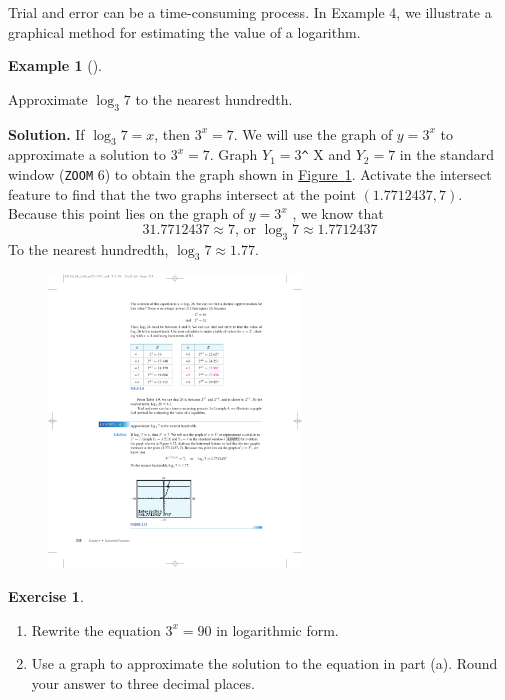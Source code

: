 \documentclass[10pt,]{book}
\theoremstyle{plain}
\theoremstyle{definition}
\theoremstyle{definition}
\newtheorem{example}[theorem]{Example}
\theoremstyle{definition}
\newtheorem{exercise}[theorem]{Exercise}
\begin{document}
	Trial and error can be a time-consuming process. In Example 4, we illustrate a graphical method for estimating the value of a logarithm.
%
\begin{example}[]\label{example-approximate-log}

	Approximate \(\log_{3}{7}\) to the nearest hundredth.
%
\par\medskip\noindent%
\textbf{Solution.}\quad 
	If \(\log_{3}{7}=x\), then \(3^x = 7\). We will use the graph of \(y = 3^x\) to approximate a solution to \(3^x = 7\). Graph \(Y_1 =3\)\lstinline?^? X and \(Y_2 = 7\) in the standard window (\lstinline?ZOOM? 6) to obtain the graph shown in \hyperref[fig-GC-approx-log]{Figure~\ref{fig-GC-approx-log}}. Activate the intersect feature to find that the two graphs intersect at the point \((1.7712437, 7)\). Because this point lies on the graph of \(y = 3^x\) , we know that
	\begin{equation*}31.7712437 \approx 7\text{, or } \log_{3}{7} \approx 1.7712437\end{equation*}
	To the nearest hundredth, \(\log_{3}{7} \approx 1.77\).
%
\leavevmode%
\begin{figure}
\centering
\includegraphics[width=0.60\textwidth,]{images/fig-GC-approx-log.pdf}\caption{\label{fig-GC-approx-log}}
\end{figure}
\end{example}
\begin{exercise}\label{exercise-approximate-log}
\leavevmode%
\begin{enumerate}[label=*\alph**]
\item\hypertarget{li-26}{}Rewrite the equation \(3^x = 90\) in logarithmic form.\item\hypertarget{li-27}{}Use a graph to approximate the solution to the equation in part (a). Round your answer to three decimal places.\end{enumerate}
\end{exercise}
\typeout{************************************************}
\typeout{************************************************}
\end{document}
